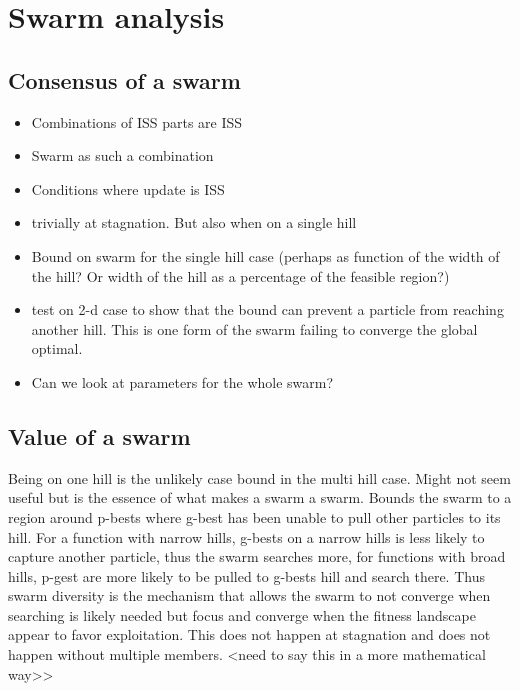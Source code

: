 \section{Swarm analysis}
\label{sec:swarm}

\subsection{Consensus of a swarm}

\begin{itemize}
\item Combinations of ISS parts are ISS
\item Swarm as such a combination
\item Conditions where update is ISS
\item trivially at stagnation. But also when on a single hill
\end{itemize}

\begin{itemize}
\item Bound on swarm for the single hill case (perhaps as function of the width of the hill?
Or width of the hill as a percentage of the feasible region?)
\item test on 2-d case to show that the bound can prevent a particle from reaching another hill.
This is one form of the swarm failing to converge the global optimal.
\item Can we look at parameters for the whole swarm?
\end{itemize}

\subsection{Value of a swarm}

Being on one hill is the unlikely case bound in the multi hill case.
Might not seem useful but is the essence of what makes a swarm a swarm.
Bounds the swarm to a region around p-bests where g-best has been unable to pull other particles to its hill.
For a function with narrow hills, g-bests on a narrow hills is less likely to capture another particle, thus the swarm searches more, for functions with broad hills, p-gest are more likely to be pulled to g-bests hill and search there.
Thus swarm diversity is the mechanism that allows the swarm to not converge when searching is likely needed but focus and converge when the fitness landscape appear to favor exploitation.
This does not happen at stagnation and does not happen without multiple members. <need to say this in a more mathematical way>>

